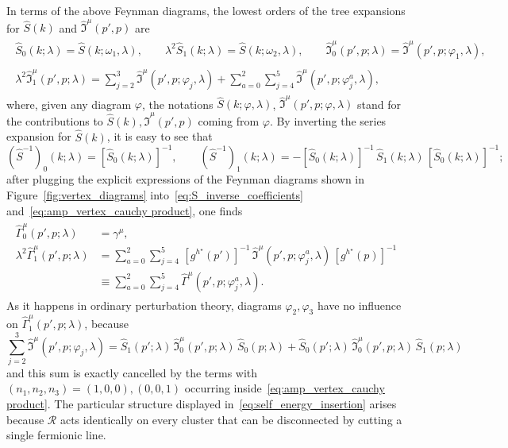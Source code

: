 \documentclass[a4paper, 11pt]{article}
\newcommand{\sing}[2]{{#1}^{#2}}							%
\renewcommand{\phi}{\varphi}								%
\newcommand{\ren}{\mathcal{R}}								%
\theoremstyle{thm}
\begin{document}
In terms of the above Feynman diagrams, the lowest orders of the tree expansions for $\hat{S}(k)$ and $\hat{\mathfrak{I}}^\mu(p', p)$ are
\begin{gather*}
\begin{split}
\hat{S}_0(k; \lambda) = \hat{S}(k; \omega_1, \lambda), \qquad \lambda^2\hat{S}_1(k; \lambda) = \hat{S}(k; \omega_2, \lambda), \qquad \hat{\mathfrak{I}}^\mu_0(p', p; \lambda) = \hat{\mathfrak{I}}^\mu(p', p; \phi_1, \lambda),
\end{split} \\
\begin{split}
\lambda^2 \hat{\mathfrak{I}}^\mu_1(p', p; \lambda) = \sum_{j=2}^3 \hat{\mathfrak{I}}^\mu(p', p; \phi_j, \lambda) + \sum_{a = 0}^2 \sum_{j=4}^5 \hat{\mathfrak{I}}^\mu(p', p; \phi_j^a, \lambda),
\end{split}
\end{gather*}
where, given any diagram $\phi$, the notations $\hat{S}(k; \phi, \lambda)$, $\hat{\mathfrak{I}}^\mu(p', p; \phi, \lambda)$ stand for the contributions to $\hat{S}(k), \hat{\mathfrak{I}}^\mu(p', p)$ coming from $\phi$. By inverting the series expansion for $\hat{S}(k)$, it is easy to see that
\begin{equation}
\label{eq:S_inverse_coefficients}
(\hat{S}^{-1})_0(k; \lambda) = [\hat{S}_0(k; \lambda)]^{-1}, \qquad (\hat{S}^{-1})_1(k; \lambda) = - [\hat{S}_0(k; \lambda)]^{-1} \, \hat{S}_1(k; \lambda) \, [\hat{S}_0(k; \lambda)]^{-1};
\end{equation}
after plugging the explicit expressions of the Feynman diagrams shown in Figure~\ref{fig:vertex_diagrams} into~\eqref{eq:S_inverse_coefficients} and~\eqref{eq:amp_vertex_cauchy product}, one finds
\begin{align}
\label{eq:amp_vertex_first_order}
\begin{split}
\hat{\Gamma}^\mu_0(p', p; \lambda) 
& = \gamma^\mu, \\
\lambda^2 \hat{\Gamma}^\mu_1(p', p; \lambda) 
& = \sum_{a = 0}^2 \sum_{j = 4}^5 \, [\sing{g}{h^\star}(p')]^{-1} \, \hat{\mathfrak{I}}^\mu(p', p; \phi_j^a, \lambda) \, [\sing{g}{h^\star}(p)]^{-1} \\
& \equiv \sum_{a = 0}^2 \sum_{j = 4}^5 \hat{\Gamma}^\mu(p', p; \phi_j^a, \lambda).
\end{split}
\end{align}
As it happens in ordinary perturbation theory, diagrams $\phi_2, \phi_3$ have no influence on $\hat{\Gamma}^\mu_1(p', p; \lambda)$, because
\begin{equation}
\label{eq:self_energy_insertion}
\sum_{j=2}^3 \hat{\mathfrak{I}}^\mu(p', p; \phi_j, \lambda) = \hat{S}_1(p'; \lambda) \, \hat{\mathfrak{I}}^\mu_0(p', p; \lambda) \, \hat{S}_0(p; \lambda) + \hat{S}_0(p'; \lambda) \, \hat{\mathfrak{I}}^\mu_0(p', p; \lambda) \, \hat{S}_1(p; \lambda)
\end{equation}
and this sum is exactly cancelled by the terms with $(n_1, n_2, n_3) = (1, 0, 0), (0, 0, 1)$ occurring inside~\eqref{eq:amp_vertex_cauchy product}. The particular structure displayed in~\eqref{eq:self_energy_insertion} arises because $\ren$ acts identically on every cluster that can be disconnected by cutting a single fermionic line.
\end{document}

